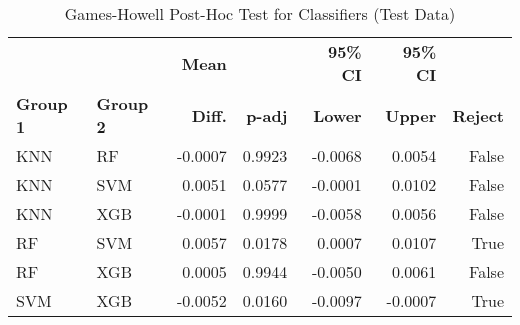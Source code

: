 \begin{table}[tb]
    \captionsetup{skip=5pt}
    \caption{Classifier Descriptive Statistics on Test Data F1-Scores}
    \label{tbl:desc_stats_classifier}
    \centering
\end{table}

\begin{table}[tb]
    \captionsetup{skip=5pt}
\centering
\caption{Games-Howell Post-Hoc Test for Classifiers (Test Data)}
\label{tbl:games_howell_classifier_full}
        \begin{tabular}{llrrrrr}
            \toprule
             &  & \textbf{Mean} &  & \textbf{95\% CI} & \textbf{95\% CI} & \\
            \textbf{Group 1} & \textbf{Group 2} & \textbf{Diff.} & \textbf{p-adj} & \textbf{Lower} & \textbf{Upper} & \textbf{Reject}\\
\midrule
KNN & RF & -0.0007 & 0.9923 & -0.0068 & 0.0054 & False \\
KNN & SVM & 0.0051 & 0.0577 & -0.0001 & 0.0102 & False \\
KNN & XGB & -0.0001 & 0.9999 & -0.0058 & 0.0056 & False \\
RF & SVM & 0.0057 & 0.0178 & 0.0007 & 0.0107 & True \\
RF & XGB & 0.0005 & 0.9944 & -0.0050 & 0.0061 & False \\
SVM & XGB & -0.0052 & 0.0160 & -0.0097 & -0.0007 & True \\
\bottomrule
\end{tabular}
\end{table}

